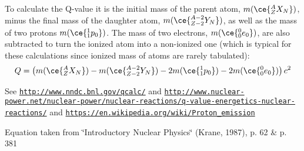To calculate the Q-\/value it is the initial mass of the parent atom, $m(\ce{ ^{A}_{Z}X_{N} })$, minus the final mass of the daughter atom, $m(\ce{ ^{A-2}_{Z-2}Y_{N} })$, as well as the mass of two protons $m(\ce{ ^{1}_{1}p_{0} })$. The mass of two electrons, $m(\ce{ ^{0}_{0}e_{0} })$, are also subtracted to turn the ionized atom into a non-\/ionized one (which is typical for these calculations since ionized mass of atoms are rarely tabulated)\+: \[Q = \left ( m(\ce{ ^{A}_{Z}X_{N} })-m(\ce{ ^{A-2}_{Z-2}Y_{N} })-2m(\ce{ ^{1}_{1}p_{0} })-2m(\ce{ ^{0}_{0}e_{0} }) \right) c^2\]

See \href{http://www.nndc.bnl.gov/qcalc/}{\tt http\+://www.\+nndc.\+bnl.\+gov/qcalc/} and \href{http://www.nuclear-power.net/nuclear-power/nuclear-reactions/q-value-energetics-nuclear-reactions/}{\tt http\+://www.\+nuclear-\/power.\+net/nuclear-\/power/nuclear-\/reactions/q-\/value-\/energetics-\/nuclear-\/reactions/} and \href{https://en.wikipedia.org/wiki/Proton_emission}{\tt https\+://en.\+wikipedia.\+org/wiki/\+Proton\+\_\+emission}

Equation taken from \char`\"{}\+Introductory Nuclear Physics\char`\"{} (Krane, 1987), p. 62 \& p. 381


